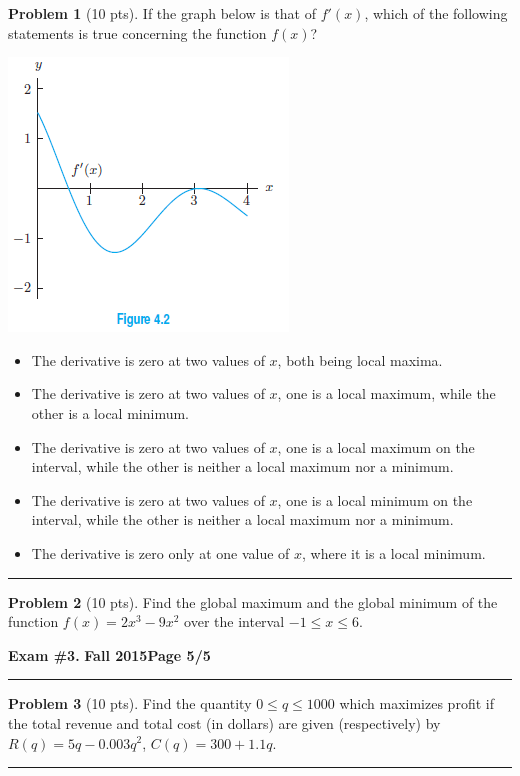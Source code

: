 \documentclass[12pt]{article}
\makeatletter
\theoremstyle{definition}
\newtheorem{problem}{Problem}
\newcommand*{\radiobutton}{%
  \@ifstar{\@radiobutton0}{\@radiobutton1}%
}
\newcommand*{\@radiobutton}[1]{%
  \begin{tikzpicture}
    \pgfmathsetlengthmacro\radius{height("X")/2}
    \draw[radius=\radius] circle;
    \ifcase#1 \fill[radius=.6*\radius] circle;\fi
  \end{tikzpicture}%
}
\makeatother
\begin{document}
\begin{problem}[10 pts]
If the graph below is that of $f'(x)$, which of the following statements is true concerning the function $f(x)$?
\begin{center}
\includegraphics{graph2}
\end{center}
\begin{itemize}
\item[\radiobutton] The derivative is zero at two values of $x$, both being local maxima.
\item[\radiobutton] The derivative is zero at two values of $x$, one is a local maximum, while the other is a local minimum.
\item[\radiobutton] The derivative is zero at two values of $x$, one is a local maximum on the interval, while the other is neither a local maximum nor a minimum.
\item[\radiobutton] The derivative is zero at two values of $x$, one is a local minimum on the interval, while the other is neither a local maximum nor a minimum.
\item[\radiobutton] The derivative is zero only at one value of $x$, where it is a local minimum.
\end{itemize}
\end{problem}

\hrule
\begin{problem}[10 pts]
Find the global maximum and the global minimum of the function $f(x) = 2x^3 - 9x^2$ over the interval $-1 \leq x \leq 6$.
\end{problem}
\newpage

\hfill{\large\bf Exam \#3.}\hfill{\large\bf
  Fall 2015}\hfill{\large\bf Page 5/5}\hrule

\bigskip
\begin{problem}[10 pts]
Find the quantity $0 \leq q \leq 1000$ which maximizes profit if the total revenue and total cost (in dollars) are given (respectively) by $R(q) = 5q - 0.003q^2$, $C(q)=300+1.1q$. 

\vspace{5cm}
\end{problem}
\hrule
\end{document}

